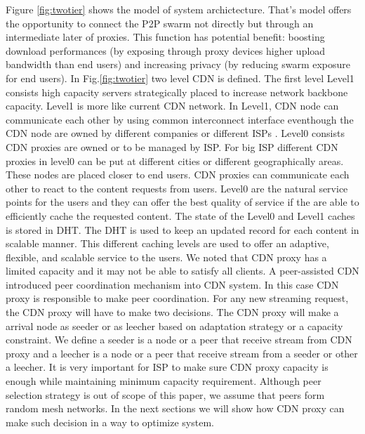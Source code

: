 \documentclass[paper]{ieice}
\begin{document}
Figure \ref{fig:twotier} shows the model of system archictecture.
That's model offers the opportunity to connect the P2P swarm not directly but through an intermediate later of proxies.
This function has potential benefit: boosting download performances (by exposing through proxy devices higher upload bandwidth than end users) and increasing privacy (by reducing swarm exposure for end users).
In Fig.\ref{fig:twotier} two level CDN is defined.
The first level Level1 consists high capacity servers strategically placed to increase network backbone capacity.
Level1 is more like current CDN network.
In Level1, CDN node can communicate each other by using common interconnect interface eventhough the CDN node are owned by different companies or different ISPs \cite{cdni}.
Level0 consists CDN proxies are owned or to be managed by ISP.
For big ISP different CDN proxies in level0 can be put at different cities or different geographically areas.
These nodes are placed closer to end users. 
CDN proxies can communicate each other to react to the content requests from users.
Level0 are the natural service points for the users and they can offer the best quality of service if the are able to efficiently cache the requested content.
The state of the Level0 and Level1 caches is stored in DHT. 
The DHT is used to keep an updated record for each content in scalable manner. 
This different caching levels are used to offer an adaptive, flexible, and scalable service to the users.
We noted that CDN proxy has a limited capacity and it may not be able to satisfy all clients.
A peer-assisted CDN introduced peer coordination mechanism into CDN system. 
In this case CDN proxy is responsible to make peer coordination.  
For any new streaming request, the CDN proxy will have to make two decisions.
The CDN proxy will make a arrival node as seeder or as leecher based on adaptation strategy or a capacity constraint.  
We define a seeder is a node or a peer that receive stream from CDN proxy and a leecher is a node or a peer that receive stream from a seeder or other a leecher.  
It is very important for ISP to make sure CDN proxy capacity is enough while maintaining minimum capacity requirement. 
Although peer selection strategy is out of scope of this paper, we assume that peers form random mesh networks. 
In the next sections we will show how CDN proxy can make such decision in a way to optimize system.

 
\end{document}
